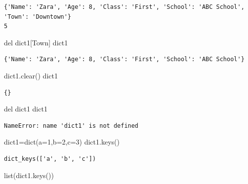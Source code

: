 \documentclass[
  a4paper,
  DIV=11,
  numbers=noendperiod]{scrreprt}
\newenvironment{Shaded}{\begin{snugshade}}{\end{snugshade}}
\newcommand{\BuiltInTok}[1]{\textcolor[rgb]{0.00,0.23,0.31}{#1}}
\newcommand{\DecValTok}[1]{\textcolor[rgb]{0.68,0.00,0.00}{#1}}
\newcommand{\KeywordTok}[1]{\textcolor[rgb]{0.00,0.23,0.31}{#1}}
\newcommand{\NormalTok}[1]{\textcolor[rgb]{0.00,0.23,0.31}{#1}}
\newcommand{\OperatorTok}[1]{\textcolor[rgb]{0.37,0.37,0.37}{#1}}
\newcommand{\StringTok}[1]{\textcolor[rgb]{0.13,0.47,0.30}{#1}}
\begin{document}
\begin{verbatim}
{'Name': 'Zara', 'Age': 8, 'Class': 'First', 'School': 'ABC School', 'Town': 'Downtown'}
5
\end{verbatim}

\begin{Shaded}
\begin{Highlighting}[]
\KeywordTok{del}\NormalTok{ dict1[}\StringTok{\textquotesingle{}Town\textquotesingle{}}\NormalTok{]}
\NormalTok{dict1}
\end{Highlighting}
\end{Shaded}

\begin{verbatim}
{'Name': 'Zara', 'Age': 8, 'Class': 'First', 'School': 'ABC School'}
\end{verbatim}

\begin{Shaded}
\begin{Highlighting}[]
\NormalTok{dict1.clear()}
\NormalTok{dict1}
\end{Highlighting}
\end{Shaded}

\begin{verbatim}
{}
\end{verbatim}

\begin{Shaded}
\begin{Highlighting}[]
\KeywordTok{del}\NormalTok{ dict1}
\NormalTok{dict1}
\end{Highlighting}
\end{Shaded}

\begin{verbatim}
NameError: name 'dict1' is not defined
\end{verbatim}

\begin{Shaded}
\begin{Highlighting}[]
\NormalTok{dict1}\OperatorTok{=}\BuiltInTok{dict}\NormalTok{(a}\OperatorTok{=}\DecValTok{1}\NormalTok{,b}\OperatorTok{=}\DecValTok{2}\NormalTok{,c}\OperatorTok{=}\DecValTok{3}\NormalTok{)}
\NormalTok{dict1.keys()}
\end{Highlighting}
\end{Shaded}

\begin{verbatim}
dict_keys(['a', 'b', 'c'])
\end{verbatim}

\begin{Shaded}
\begin{Highlighting}[]
\BuiltInTok{list}\NormalTok{(dict1.keys())}
\end{Highlighting}
\end{Shaded}
\end{document}
